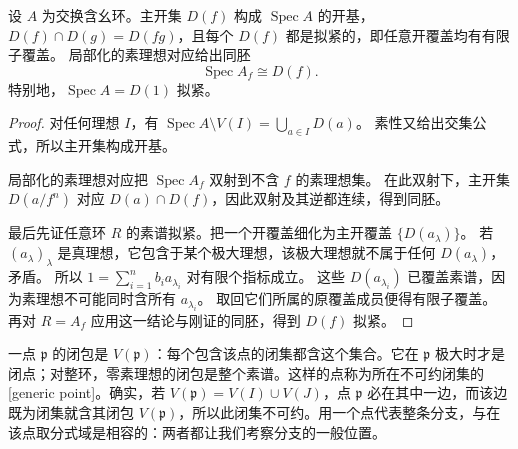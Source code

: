 \begin{proposition}\label{g5:prop:spec-basic-opens}
	设 \(A\) 为交换含幺环。主开集 \(D(f)\) 构成 \(\operatorname{Spec}A\) 的开基， \(D(f)\cap D(g)=D(fg)\)，且每个 \(D(f)\) 都是拟紧的，即任意开覆盖均有有限子覆盖。 局部化的素理想对应给出同胚
	\[
	\operatorname{Spec}A_f\cong D(f).
	\]
	特别地，\(\operatorname{Spec}A=D(1)\) 拟紧。
\end{proposition}
\begin{proof}
	对任何理想 \(I\)，有 \(\operatorname{Spec}A\setminus V(I)=\bigcup_{a\in I}D(a)\)。 素性又给出交集公式，所以主开集构成开基。

	局部化的素理想对应把 \(\operatorname{Spec}A_f\) 双射到不含 \(f\) 的素理想集。 在此双射下，主开集 \(D(a/f^n)\) 对应 \(D(a)\cap D(f)\)，因此双射及其逆都连续，得到同胚。

	最后先证任意环 \(R\) 的素谱拟紧。把一个开覆盖细化为主开覆盖 \(\{D(a_\lambda)\}\)。 若 \((a_\lambda)_\lambda\) 是真理想，它包含于某个极大理想，该极大理想就不属于任何 \(D(a_\lambda)\)，矛盾。 所以 \(1=\sum_{i=1}^n b_i a_{\lambda_i}\) 对有限个指标成立。 这些 \(D(a_{\lambda_i})\) 已覆盖素谱，因为素理想不可能同时含所有 \(a_{\lambda_i}\)。 取回它们所属的原覆盖成员便得有限子覆盖。 再对 \(R=A_f\) 应用这一结论与刚证的同胚，得到 \(D(f)\) 拟紧。
\end{proof}

一点 \(\mathfrak p\) 的闭包是 \(V(\mathfrak p)\)：每个包含该点的闭集都含这个集合。它在 \(\mathfrak p\) 极大时才是闭点；对整环，零素理想的闭包是整个素谱。这样的点称为所在不可约闭集的[generic point]。确实，若 \(V(\mathfrak p)=V(I)\cup V(J)\)，点 \(\mathfrak p\) 必在其中一边，而该边既为闭集就含其闭包 \(V(\mathfrak p)\)，所以此闭集不可约。用一个点代表整条分支，与在该点取分式域是相容的：两者都让我们考察分支的一般位置。

